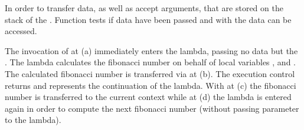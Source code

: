 In order to transfer data, \call as well as \resume accept arguments, that are
stored on the stack of the \currcont. Function \davail tests if data have been
passed and with \dget the data can be accessed.

The invocation of \call at (a) immediately enters the lambda, passing no data
but the \currcont. The lambda calculates the fibonacci number on behalf of local
variables ,  and . The calculated fibonacci number is
transferred via \resume at (b). The execution control returns and 
represents the continuation of the lambda. With \dget at (c) the fibonacci
number is transferred to the current context while at (d) the lambda is entered
again in order to compute the next fibonacci number (without passing parameter
to the lambda).
